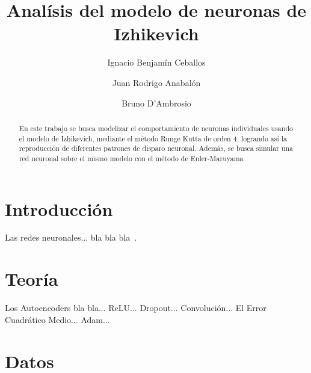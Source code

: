 \documentclass[aps,prl,preprint,groupedaddress]{revtex4-2}
\begin{document}

\title{
Analísis del modelo de neuronas de Izhikevich
}


\author{Ignacio Benjamín Ceballos}

\author{Juan Rodrigo Anabalón}

\author{Bruno D'Ambrosio}



\begin{abstract}
En este trabajo se busca modelizar el comportamiento de neuronas individuales  usando el modelo de Izhikevich, mediante el método Runge Kutta de orden 4, logrando así la reproducción de diferentes patrones de disparo neuronal. Además, se busca simular una red neuronal sobre el mismo modelo con el método de Euler-Maruyama
\end{abstract}


\maketitle

\section{Introducción}

Las redes neuronales... bla bla bla~\cite{hertz1999introduction}.

\section{Teoría}

Los Autoencoders bla bla...
ReLU...
Dropout...
Convolución...
El Error Cuadrático Medio...
Adam...

\section{Datos}
\end{document}
